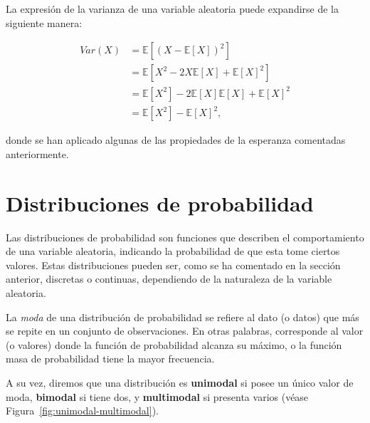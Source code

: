 \begin{observacion}
    La expresión de la varianza de una variable aleatoria puede expandirse de la siguiente manera:

    \begin{align*}
        Var(X) &= \mathbb{E}[{(X - \mathbb{E}[X])}^2] \\
        &= \mathbb{E}[X^2 - 2X\mathbb{E}[X] + \mathbb{E}{[X]}^2] \\
        &=  \mathbb{E}[X^2] - 2\mathbb{E}[X]\mathbb{E}[X] + \mathbb{E}{[X]}^2 \\
        &= \mathbb{E}[X^2]  - \mathbb{E}{[X]}^2,
    \end{align*}

    donde se han aplicado algunas de las propiedades de la esperanza comentadas anteriormente.
\end{observacion}

\section{Distribuciones de probabilidad}

Las distribuciones de probabilidad son funciones que describen el comportamiento de una variable aleatoria, indicando la probabilidad de que esta tome ciertos valores. Estas distribuciones pueden ser, como se ha comentado en la sección anterior, discretas o continuas, dependiendo de la naturaleza de la variable aleatoria.

\begin{definicion}[Moda]
    La \textit{moda} de una distribución de probabilidad se refiere al dato (o datos) que más se repite en un conjunto de observaciones. En otras palabras, corresponde al valor (o valores) donde la función de probabilidad alcanza su máximo, o la función masa de probabilidad tiene la mayor frecuencia.
\end{definicion}

A su vez, diremos que una distribución es \textbf{unimodal} si posee un único valor de moda, \textbf{bimodal} si tiene dos, y \textbf{multimodal} si presenta varios (véase Figura~\ref{fig:unimodal-multimodal}).

